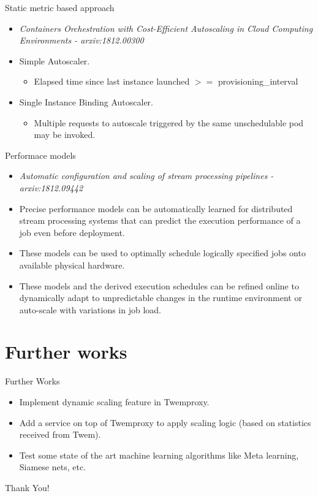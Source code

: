\documentclass{beamer}
\begin{document}
\begin{frame}{Static metric based approach}
    \begin{itemize}
        \item \textit{Containers Orchestration with Cost-Efficient Autoscaling in Cloud Computing Environments - arxiv:1812.00300}
        \item Simple Autoscaler.
            \begin{itemize}
                \item Elapsed time since last instance launched $>=$ provisioning\_interval
            \end{itemize}
        \item Single Instance Binding Autoscaler.
            \begin{itemize}
                \item Multiple requests to autoscale triggered by the same unschedulable pod may be invoked.
            \end{itemize}
    \end{itemize}
\end{frame}

\begin{frame}{Performace models}
    \begin{itemize}
        \item \textit{Automatic configuration and scaling of stream processing pipelines - arxiv:1812.09442}
        \item Precise performance models can be automatically
learned for distributed stream processing systems
that can predict the execution performance of a job
even before deployment.
    \item These models can be
used to optimally schedule logically specified jobs onto
available physical hardware.

    \item These models and
the derived execution schedules can be refined online to
dynamically adapt to unpredictable changes in the runtime
environment or auto-scale with variations in job
load.
    \end{itemize}
\end{frame}


\section{Further works}
\begin{frame}{Further Works}
    \begin{itemize}
        \item Implement dynamic scaling feature in Twemproxy.
        \item Add a service on top of Twemproxy to apply scaling logic (based on statistics received from Twem).

        \item Test some state of the art machine learning algorithms like Meta learning, Siamese nets, etc.
    \end{itemize}
\end{frame}

\begin{frame}
    \begin{center}
    \Huge{Thank You!}
    \end{center}
    \end{frame}
\end{document}
